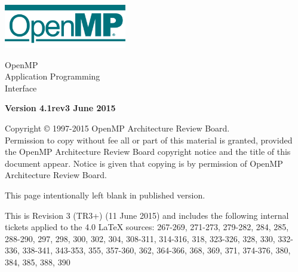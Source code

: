 
  \begin{titlepage}
    \begin{flushleft}
     \hspace{-6em} \includegraphics[width=0.4\textwidth]{openmp-logo.png}
    \end{flushleft}

    \begin{adjustwidth}{-0.75in}{0in}
    \begin{center}
      \Huge
      \textsf{OpenMP\\Application Programming\\Interface}

      \vspace{0.5in}\textsf{    }\vspace{-0.7in}
      \normalsize

      \vspace{1.0in}

      \textbf{Version 4.1rev3 June 2015}
    \end{center}
    \end{adjustwidth}

    \vspace{3.0in}

\begin{adjustwidth}{0pt}{1em}\setlength{\parskip}{0.25\baselineskip}%
Copyright © 1997-2015 OpenMP Architecture Review Board.\\
Permission to copy without fee all or part of this material is granted,
provided the OpenMP Architecture Review Board copyright notice and
the title of this document appear. Notice is given that copying is by
permission of OpenMP Architecture Review Board.\end{adjustwidth}

  \end{titlepage}


\clearpage
\thispagestyle{empty}
\phantom{a}
This page intentionally left blank in published version.

This is Revision 3 (TR3+) (11 June 2015) and includes the following 
internal tickets applied to the 4.0 LaTeX sources:
267-269, 271-273, 279-282, 284, 285, 288-290, 297, 298, 300, 302, 304, 
308-311, 314-316, 318, 323-326, 328, 330, 332-336, 338-341, 343-353, 355, 
357-360, 362, 364-366, 368, 369, 371, 374-376, 380, 384, 385, 388, 390 


\vfill

